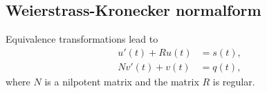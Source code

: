 	\subsection{Weierstrass-Kronecker normalform}
	
	\begin{frame}
		\vfill
		
			Equivalence transformations lead to
		\begin{equation}
			\label{transformed-DAE-const-coeff}
			\begin{aligned}
				u'(t) + Ru(t) &= s(t), \\
				Nv'(t) + v(t) &= q(t),
			\end{aligned}
		\end{equation}
		where $N$ is a nilpotent matrix and the matrix $R$ is regular.
		\vfill
	\end{frame}
	
